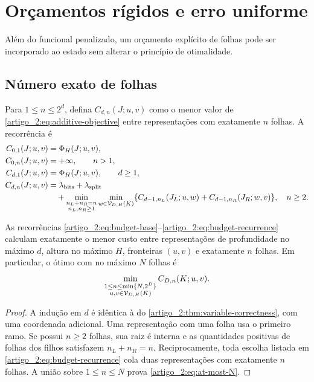\section{Orçamentos rígidos e erro uniforme}
\label{artigo_2:sec:hard-budgets}

Além do funcional penalizado, um orçamento explícito de folhas pode ser
incorporado ao estado sem alterar o princípio de otimalidade.

\subsection{Número exato de folhas}

Para $1\le n\le2^d$, defina $C_{d,n}(J;u,v)$ como o menor valor de
\eqref{artigo_2:eq:additive-objective} entre representações com exatamente $n$ folhas.
A recorrência é
\begin{align}
 C_{0,1}(J;u,v)&=\Phi_H(J;u,v),\label{artigo_2:eq:budget-base}\\
 C_{0,n}(J;u,v)&=+\infty,\qquad n>1,\notag\\
 C_{d,1}(J;u,v)&=\Phi_H(J;u,v),\qquad d\ge1,\label{artigo_2:eq:budget-one}\\
 C_{d,n}(J;u,v)&=\lambda_{\rm bits}+\lambda_{\rm split}\notag\\
 &\quad+\min_{\substack{n_L+n_R=n\\n_L,n_R\ge1}}
 \min_{w\in\mathcal{V}_{D,H}(K)}
 \{C_{d-1,n_L}(J_L;u,w)+C_{d-1,n_R}(J_R;w,v)\},
 \quad n\ge2.
 \label{artigo_2:eq:budget-recurrence}
\end{align}

\begin{theorem}\label{map:artigo_2:8.1}
\label{artigo_2:thm:leaf-budget}
As recorrências \eqref{artigo_2:eq:budget-base}--\eqref{artigo_2:eq:budget-recurrence}
calculam exatamente o menor custo entre representações de profundidade no
máximo $d$, altura no máximo $H$, fronteiras $(u,v)$ e exatamente $n$
folhas. Em particular, o ótimo com no máximo $N$ folhas é
\begin{equation}
 \min_{\substack{1\le n\le\min\{N,2^D\}\\
                  u,v\in\mathcal{V}_{D,H}(K)}}
 C_{D,n}(K;u,v).
 \label{artigo_2:eq:at-most-N}
\end{equation}
\end{theorem}

\begin{proof}
A indução em $d$ é idêntica à do
\cref{artigo_2:thm:variable-correctness}, com uma coordenada adicional. Uma
representação com uma folha usa o primeiro ramo. Se possui $n\ge2$ folhas,
sua raiz é interna e as quantidades positivas de folhas dos filhos satisfazem
$n_L+n_R=n$. Reciprocamente, toda escolha listada em
\eqref{artigo_2:eq:budget-recurrence} cola duas representações com exatamente $n$
folhas. A união sobre $1\le n\le N$ prova \eqref{artigo_2:eq:at-most-N}.
\end{proof}

